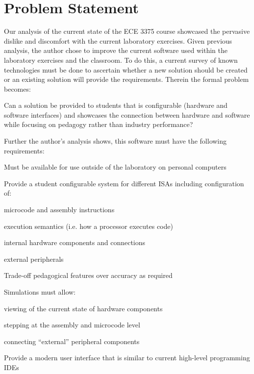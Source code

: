 \section{Problem Statement}
\label{sec:problem-statement}

Our analysis of the current state of the ECE 3375 course showcased the pervasive dislike and discomfort with the current laboratory exercises\cite{evals:ece3375-2013, evals:ece3375-2014}. Given previous analysis, the author chose to improve the current software used within the laboratory exercises and the classroom. To do this, a current survey of known technologies must be done to ascertain whether a new solution should be created or an existing solution will provide the requirements. Therein the formal problem becomes: 
\begin{displayquote}
    Can a solution be provided to students that is configurable (hardware and software interfaces) and showcases the connection between hardware and software while focusing on pedagogy rather than industry performance? 
\end{displayquote}
Further the author's analysis shows, this software must have the following requirements: 

\begin{requirements}
    \item\label{req:personal} Must be available for use outside of the laboratory on personal computers
        
    \item\label{req:configuration} Provide a student configurable system for different ISAs including configuration of:
        \begin{requirements}
            \item microcode and assembly instructions
            \item execution semantics (i.e. how a processor executes code)
            \item internal hardware components and connections
            \item external peripherals
        \end{requirements}
        
    \item\label{req:pedagogical} Trade-off pedagogical features over accuracy as required
       
    \item\label{req:simulations} Simulations must allow: 
        \begin{requirements}
            \item viewing of the current state of hardware components
            \item stepping at the assembly and microcode level
            \item connecting ``external'' peripheral components
        \end{requirements}
    
    \item \label{req:modern} Provide a modern user interface that is similar to current high-level programming IDEs
        
\end{requirements}

